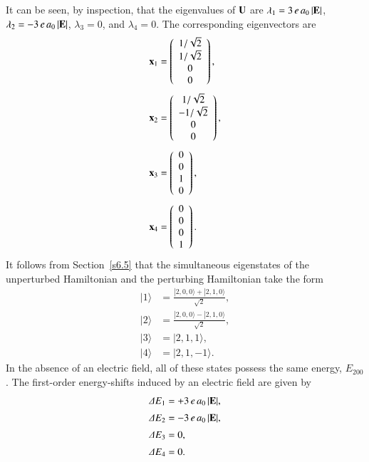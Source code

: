 It can be seen, by inspection, that the eigenvalues of ${\bf U}$ are
$\lambda_1= 3\,e\,a_0\,|{\bf E}|$, $\lambda_2 = -  3\,e\,a_0\,|{\bf E}|$, $\lambda_3=0$,
and $\lambda_4 =0$. The corresponding eigenvectors are
\begin{align}
{\bf x}_1 &= \left( \begin{array}{c} 1/\sqrt{2} \\ 1/\sqrt{2} \\ 0 \\ 0 \end{array}
\right),\\[0.5ex]
{\bf x}_2 &= \left( \begin{array}{c} 1/\sqrt{2} \\- 1/\sqrt{2} \\ 0 \\ 0 \end{array}
\right),\\[0.5ex]
{\bf x}_3 &= \left( \begin{array}{c} 0 \\0 \\ 1 \\0 \end{array}
\right),\\[0.5ex]
{\bf x}_4 &= \left( \begin{array}{c} 0 \\ 0\\ 0 \\ 1\end{array}
\right).
\end{align}
It follows from Section~\ref{s6.5} that the 
simultaneous eigenstates of the unperturbed Hamiltonian and the
perturbing Hamiltonian take the form
\begin{align}
|1\rangle &= \frac{|2,0,0\rangle + |2,1,0\rangle}{\sqrt{2}},\\[0.5ex]
|2\rangle &= \frac{|2,0,0\rangle - |2,1,0\rangle}{\sqrt{2}},\\[0.5ex]
|3\rangle &= |2,1,1\rangle,\\[0.5ex]
|4\rangle &= |2,1,-1\rangle.
\end{align}
In the absence of an electric field, all of these states possess the
same energy, $E_{200}$. 
 The first-order energy-shifts induced by an electric field are
given by
\begin{align}
{\mit\Delta} E_1 &= +3\,e\,a_0\, |{\bf E}|,\\[0.5ex]
{\mit\Delta} E_2 &= -3\,e\,a_0 \,|{\bf E}|,\\[0.5ex]
{\mit\Delta} E_3 &= 0,\\[0.5ex]
{\mit\Delta} E_4 &= 0.
\end{align}
